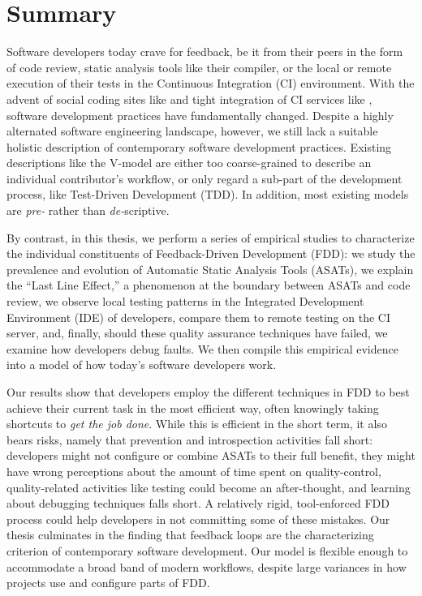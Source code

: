 \chapter*{Summary}

Software developers today crave for feedback, be it from their peers in the form of code review,
static analysis tools like their compiler, or the local or remote execution of their tests in the
Continuous Integration (CI) environment. With the advent of social coding sites like \github and
tight integration of CI services like \travis, software development practices have fundamentally
changed.  Despite a highly alternated software engineering landscape, however, we still lack a
suitable holistic description of contemporary software development practices. Existing descriptions
like the V-model are either too coarse-grained to describe an individual contributor's workflow, or
only regard a sub-part of the development process, like Test-Driven Development (TDD). In addition,
most existing models are \emph{pre-} rather than \emph{de-}scriptive.

By contrast, in this thesis, we perform a series of empirical studies to characterize the
individual constituents of Feedback-Driven Development (FDD): we study the prevalence and evolution
of Automatic Static Analysis Tools (ASATs), we explain the ``Last Line Effect,'' a phenomenon at
the boundary between ASATs and code review, we observe local testing patterns in the Integrated
Development Environment (IDE) of developers, compare them to remote testing on the CI server, and,
finally, should these quality assurance techniques have failed, we examine how developers debug
faults. We then compile this empirical evidence into a model of how today's software
developers work.

Our results show that developers employ the different techniques in FDD to best achieve their
current task in the most efficient way, often knowingly taking shortcuts to \emph{get the job
  done}. While this is efficient in the short term, it also bears risks, namely that prevention and
introspection activities fall short: developers might not configure or combine ASATs to their full
benefit, they might have wrong perceptions about the amount of time spent on quality-control,
quality-related activities like testing could become an after-thought, and learning about debugging
techniques falls short. A relatively rigid, tool-enforced FDD process could help developers in not
committing some of these mistakes. Our thesis culminates in the finding that feedback loops are
the characterizing criterion of contemporary software development. Our model is flexible enough to
accommodate a broad band of modern workflows, despite large variances in how projects use and
configure parts of FDD.

